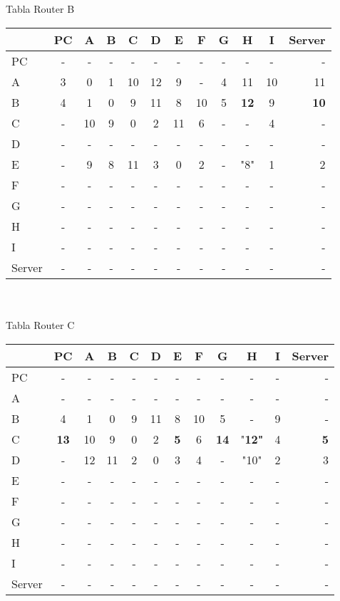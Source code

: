 \documentclass{article}
\begin{document}
\\
\\
Tabla Router B \\
\begin{tabular}{l*{10}{c}r}
              & PC & A & B & C & D & E & F & G & H & I & Server \\
\hline
PC             & - & - & - & - & - & - & - & - & - & - & -\\
A              & 3 & 0 & 1 & 10 & 12 & 9 & - & 4 & 11 & 10 & 11 \\
B              & 4 & 1 & 0 & 9 & 11 & 8 & 10 & 5 &\bf{12}& 9 &\bf{10}\\
C              & - & 10 & 9 & 0 & 2 & 11 & 6 & - & - & 4 & -\\
D              & - & - & - & - & - & - & - & - & - & - & -\\
E              & - & 9 & 8 & 11 & 3 & 0 & 2 & - & "8" & 1 & 2\\
F              & - & - & - & - & - & - & - & - & - & - & -\\
G              & - & - & - & - & - & - & - & - & - & - & -\\
H              & - & - & - & - & - & - & - & - & - & - & -\\
I              & - & - & - & - & - & - & - & - & - & - & -\\
Server         & - & - & - & - & - & - & - & - & - & - & -\\

\end{tabular}
\\
\\
Tabla Router C \\
\begin{tabular}{l*{10}{c}r}
              & PC & A & B & C & D & E & F & G & H & I & Server \\
\hline
PC             & - & - & - & - & - & - & - & - & - & - & -\\
A              & - & - & - & - & - & - & - & - & - & - & -\\
B              & 4 & 1 & 0 & 9 & 11	& 8 & 10 & 5 & - & 9 & -\\
C              &\bf{13}& 10 & 9 & 0 & 2 &\bf{5}& 6 &\bf{14}&"\bf{12}"& 4 &\bf{5}\\
D              & - & 12 & 11 & 2 & 0 & 3 & 4 & - & "10" & 2 & 3\\
E              & - & - & - & - & - & - & - & - & - & - & -\\
F              & - & - & - & - & - & - & - & - & - & - & -\\
G              & - & - & - & - & - & - & - & - & - & - & -\\
H              & - & - & - & - & - & - & - & - & - & - & -\\
I              & - & - & - & - & - & - & - & - & - & - & -\\
Server         & - & - & - & - & - & - & - & - & - & - & -\\
\end{tabular}
\end{document}
